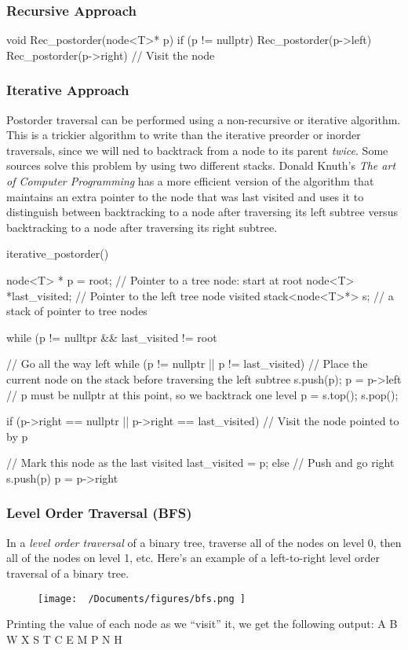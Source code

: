 \documentclass{report}
\begin{document}
\subsubsection*{Recursive Approach}
\begin{cppcode}
  void Rec_postorder(node<T>* p) {
    if (p != nullptr) {
      Rec_postorder(p->left)
      Rec_postorder(p->right)
      // Visit the node
    }
  }
\end{cppcode}
\subsubsection*{Iterative Approach}
Postorder traversal can be performed using a non-recursive or iterative algorithm. This is a trickier algorithm to write than the iterative preorder or inorder traversals, since we will ned to backtrack from a node to its parent \textit{twice}. Some sources solve this problem by using two different stacks. Donald Knuth's \textit{The art of Computer Programming} has a more efficient version of the algorithm that maintains an extra pointer to the node that was last visited and uses it to distinguish between backtracking to a node after traversing its left subtree versus backtracking to a node after traversing its right subtree.
\begin{cppcode}
  iterative_postorder() {

    node<T> * p = root; // Pointer to a tree node: start at root
    node<T> *last_visited; // Pointer to the left tree node visited
    stack<node<T>*> s; // a stack of pointer to tree nodes
    
    while (p != nulltpr && last_visited != root { 

      // Go all the way left
      while (p != nullptr || p != last_visited) {
        // Place the current node on the stack before traversing the left subtree
        s.push(p);
        p = p->left
      } 
    // p must be nullptr at this point, so we backtrack one level
    p = s.top(); s.pop();

    if (p->right == nullptr || p->right == last_visited)
      // Visit the node pointed to by p

      // Mark this node as the last visited
      last_visited = p;
    else { // Push and go right
      s.push(p)
      p = p->right
    }
  }
}
\end{cppcode}
\subsubsection{Level Order Traversal (BFS)}
In a \textit{level order traversal} of a binary tree, traverse all of the nodes on level 0, then all of the nodes on level 1, etc.
\bigbreak \noindent
Here's an example of a left-to-right level order traversal of a binary tree.
\begin{figure}[ht]
\centering
\texttt{[image:  ~/Documents/figures/bfs.png ]}
\end{figure}
\bigbreak \noindent
Printing the value of each node as we ``visit'' it, we get the following output:
\bigbreak \noindent
A B W X S T C E M P N H
\end{document}
